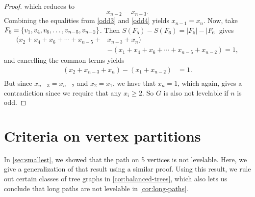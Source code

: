 \begin{proof}
which reduces to
\begin{equation} \label{odd4}
x_{n-2} = x_{n-3}.
\end{equation}
Combining the equalities from \eqref{odd3} and \eqref{odd4} yields $x_{n-1} = x_n$. Now, take $F_6 = \{ v_1, v_4, v_6, \dots, v_{n-5}, v_{n-2} \}$. Then $S(F_5) - S(F_6) = |F_5| - |F_6|$ gives
\begin{equation*}
\begin{aligned}
\label{odd5}
(x_2+ x_4+ x_6 + \cdots + x_{n-5} + &x_{n-3}+ x_n) \\ &- (x_1 + x_4 + x_6 + \cdots + x_{n-5} + x_{n-2}) = 1,
\end{aligned}
\end{equation*}
and cancelling the common terms yields
\begin{equation*}
\begin{aligned}
(x_2+  x_{n-3}+ x_n) - (x_1 + x_{n-2}) &= 1. \\
\end{aligned}
\end{equation*}
But since $x_{n-3} = x_{n-2}$ and $x_2 = x_1$, we have that $x_n = 1$, which again, gives a contradiction since we require that any $x_i \geq 2$. So $G$ is also not levelable if $n$ is odd.
\end{proof}

\section{Criteria on vertex partitions} \label{sec:criteria}

In \autoref{sec:smallest}, we showed that the path on 5 vertices is not levelable. Here, we give a generalization of that result using a similar proof. Using this result, we rule out certain classes of tree graphs in \autoref{cor:balanced-trees}, which also lets us conclude that long paths are not levelable in \autoref{cor:long-paths}.

